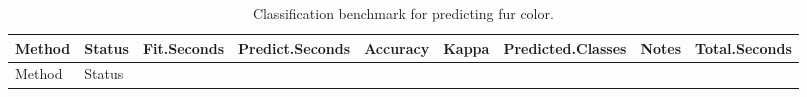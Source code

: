 \documentclass[
  11pt,
]{article}
\begin{document}
\begin{longtable}[]{@{}
  >{\raggedright\arraybackslash}p{}
  >{\raggedright\arraybackslash}p{}
  >{\raggedleft\arraybackslash}p{}
  >{\raggedleft\arraybackslash}p{}
  >{\raggedleft\arraybackslash}p{}
  >{\raggedleft\arraybackslash}p{}
  >{\raggedleft\arraybackslash}p{}
  >{\raggedright\arraybackslash}p{}
  >{\raggedleft\arraybackslash}p{}@{}}
\caption{Classification benchmark for predicting fur
color.}\tabularnewline
\toprule\noalign{}
\begin{minipage}[b]{\linewidth}\raggedright
Method
\end{minipage} & \begin{minipage}[b]{\linewidth}\raggedright
Status
\end{minipage} & \begin{minipage}[b]{\linewidth}\raggedleft
Fit.Seconds
\end{minipage} & \begin{minipage}[b]{\linewidth}\raggedleft
Predict.Seconds
\end{minipage} & \begin{minipage}[b]{\linewidth}\raggedleft
Accuracy
\end{minipage} & \begin{minipage}[b]{\linewidth}\raggedleft
Kappa
\end{minipage} & \begin{minipage}[b]{\linewidth}\raggedleft
Predicted.Classes
\end{minipage} & \begin{minipage}[b]{\linewidth}\raggedright
Notes
\end{minipage} & \begin{minipage}[b]{\linewidth}\raggedleft
Total.Seconds
\end{minipage} \\
\midrule\noalign{}
\endfirsthead
\toprule\noalign{}
\begin{minipage}[b]{\linewidth}\raggedright
Method
\end{minipage} & \begin{minipage}[b]{\linewidth}\raggedright
Status
\end{minipage} & \begin{minipage}[b]{\linewidth}\raggedleft

\end{minipage}
\end{longtable}
\end{document}

